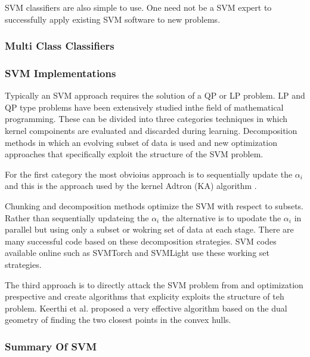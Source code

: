 SVM classifiers are also simple to use. One need not be a SVM expert to successfully apply existing SVM software to new problems. 


\subsubsection {Multi Class Classifiers}



\subsubsection {SVM Implementations}
Typically an SVM approach requires the solution of a QP or LP problem. LP and QP type problems have been extensively studied inthe field of mathematical programming. These can be divided into three categories techniques in which kernel compoinents are evaluated and discarded during learning. Decomposition methods in which an evolving subset of data is used and new optimization approaches that specifically exploit the structure of the SVM problem. 

For the first category the most obvioius  approach is to sequentially update the $\alpha_i$  and this is the approach used by the kernel  Adtron (KA) algorithm \cite{kernelSVM4}. 

Chunking and decomposition methods optimize the SVM with respect to subsets. Rather than sequentially updateing the $\alpha_i$ the alternative is to upodate the $\alpha_i$ in parallel but using only a subset or wokring set of data at each stage. There are many successful code based on these decomposition strategies. SVM codes available online such as SVMTorch \cite{svmTorch} and SVMLight \cite{SVMlight} use these working set strategies. 


The third approach is to directly attack the SVM  problem from and optimization prespective and create algorithms that explicity exploits the structure of teh problem. Keerthi et al. \cite{fastSVM6} proposed a very effective algorithm based on the dual geometry of finding the two closest points in the convex hulls. 
 
\subsubsection {Summary Of SVM}


